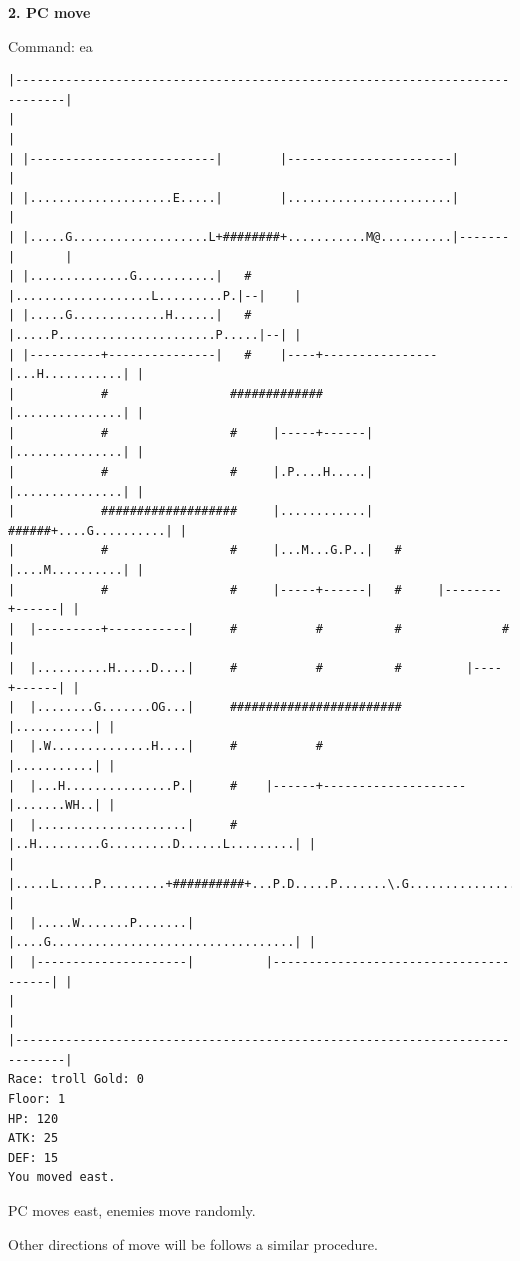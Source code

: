 \documentclass[11pt]{article}
\theoremstyle{plain}
\begin{document}
\newpage
\textbf{2. PC move}

Command: ea
\begin{Verbatim}[fontsize=\scriptsize]
|-----------------------------------------------------------------------------|
|                                                                             |
| |--------------------------|        |-----------------------|               |
| |....................E.....|        |.......................|               |
| |.....G...................L+########+...........M@..........|-------|       |
| |..............G...........|   #    |...................L.........P.|--|    |
| |.....G.............H......|   #    |.....P......................P.....|--| |
| |----------+---------------|   #    |----+----------------|...H...........| |
|            #                 #############                |...............| |
|            #                 #     |-----+------|         |...............| |
|            #                 #     |.P....H.....|         |...............| |
|            ###################     |............|   ######+....G..........| |
|            #                 #     |...M...G.P..|   #     |....M..........| |
|            #                 #     |-----+------|   #     |--------+------| |
|  |---------+-----------|     #           #          #              #        |
|  |..........H.....D....|     #           #          #         |----+------| |
|  |........G.......OG...|     ########################         |...........| |
|  |.W..............H....|     #           #                    |...........| |
|  |...H...............P.|     #    |------+--------------------|.......WH..| |
|  |.....................|     #    |..H.........G.........D......L.........| |
|  |.....L.....P.........+##########+...P.D.....P.......\.G.................| |
|  |.....W.......P.......|          |....G..................................| |
|  |---------------------|          |---------------------------------------| |
|                                                                             |
|-----------------------------------------------------------------------------|
Race: troll Gold: 0                                                    Floor: 1
HP: 120
ATK: 25
DEF: 15
You moved east. 
\end{Verbatim}

PC moves east, enemies move randomly. 

Other directions of move will be follows a similar procedure.
\end{document}
